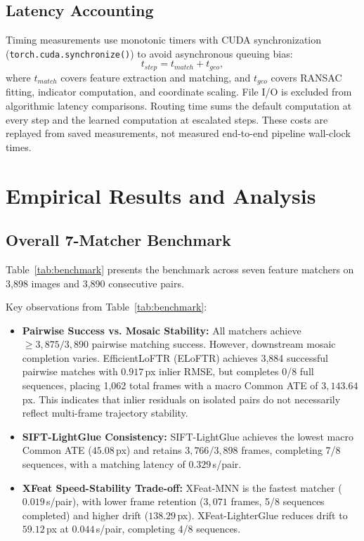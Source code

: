 \documentclass[conference]{IEEEtran}
\begin{document}
\subsection{Latency Accounting}
\label{subsec:metric_latency}

Timing measurements use monotonic timers with CUDA synchronization (\texttt{torch.cuda.synchronize()}) to avoid asynchronous queuing bias:
\begin{equation}
t_{step} = t_{match} + t_{geo},
\label{eq:time_accounting}
\end{equation}
where $t_{match}$ covers feature extraction and matching, and $t_{geo}$ covers RANSAC fitting, indicator computation, and coordinate scaling. File I/O is excluded from algorithmic latency comparisons.
Routing time sums the default computation at every step and the learned computation at escalated steps. These costs are replayed from saved measurements, not measured end-to-end pipeline wall-clock times.

\section{Empirical Results and Analysis}
\label{sec:results}

\subsection{Overall 7-Matcher Benchmark}
\label{subsec:benchmark_results}

Table~\ref{tab:benchmark} presents the benchmark across seven feature matchers on 3,898 images and 3,890 consecutive pairs.

\begin{table}[t]
\centering
\caption{Overall Feature Matcher Benchmark Across Eight UAV Video Sequences}
\label{tab:benchmark}
\footnotesize

\end{table}

Key observations from Table~\ref{tab:benchmark}:
\begin{itemize}
    \item \textbf{Pairwise Success vs. Mosaic Stability:} All matchers achieve $\ge 3{,}875 / 3{,}890$ pairwise matching success. However, downstream mosaic completion varies. EfficientLoFTR (ELoFTR) achieves 3,884 successful pairwise matches with $0.917$\,px inlier RMSE, but completes 0/8 full sequences, placing 1,062 total frames with a macro Common ATE of $3{,}143.64$\,px. This indicates that inlier residuals on isolated pairs do not necessarily reflect multi-frame trajectory stability.
    \item \textbf{SIFT-LightGlue Consistency:} SIFT-LightGlue achieves the lowest macro Common ATE ($45.08$\,px) and retains $3{,}766 / 3{,}898$ frames, completing 7/8 sequences, with a matching latency of $0.329$\,s/pair.
    \item \textbf{XFeat Speed-Stability Trade-off:} XFeat-MNN is the fastest matcher ($0.019$\,s/pair), with lower frame retention ($3{,}071$ frames, 5/8 sequences completed) and higher drift ($138.29$\,px). XFeat-LighterGlue reduces drift to $59.12$\,px at $0.044$\,s/pair, completing 4/8 sequences.
\end{itemize}
\end{document}
